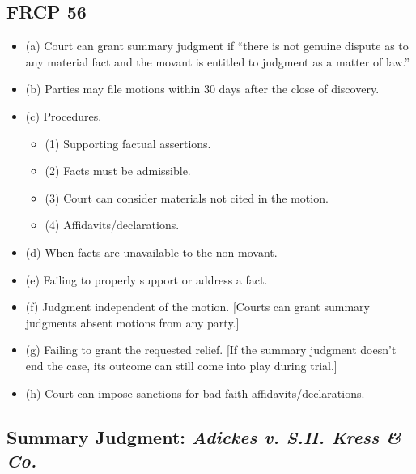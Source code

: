 \subsection{FRCP 56}

\begin{itemize}
    \item (a) Court can grant summary judgment if ``there is not genuine dispute as to any material fact and the movant is entitled to judgment as a matter of law.''
    \item (b) Parties may file motions within 30 days after the close of discovery.
    \item (c) Procedures.
    \begin{itemize}
        \item (1) Supporting factual assertions.
        \item (2) Facts must be admissible.
        \item (3) Court can consider materials not cited in the motion.
        \item (4) Affidavits/declarations.
    \end{itemize}
    \item (d) When facts are unavailable to the non-movant.
    \item (e) Failing to properly support or address a fact.
    \item (f) Judgment independent of the motion. [Courts can grant summary judgments absent motions from any party.]
    \item (g) Failing to grant the requested relief. [If the summary judgment doesn't end the case, its outcome can still come into play during trial.]
    \item (h) Court can impose sanctions for bad faith affidavits/declarations.
\end{itemize}

\subsection{Summary Judgment: \emph{Adickes v. S.H. Kress \& Co.}}

